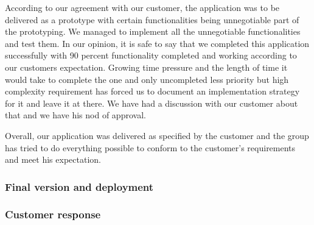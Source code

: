     According to our agreement with our customer, the application was to be delivered as a prototype with certain functionalities being unnegotiable part of the prototyping. We managed to implement all the unnegotiable functionalities and test them. In our opinion, it is safe to say that we completed this application successfully with 90 percent functionality completed and working according to our customers expectation. Growing time pressure and the length of time it would take to complete the one and only uncompleted less priority but high complexity requirement has forced us to document an implementation strategy for it and leave it at there. We have had a discussion with our customer about that and we have his nod of approval.
    
    Overall, our application was delivered as specified by the customer and the group has tried to do everything possible to conform to the customer's requirements and meet his expectation.
	\subsubsection{Final version and deployment}
	\subsubsection{Customer response}
	


